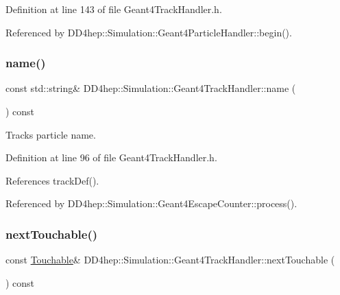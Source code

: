 Definition at line 143 of file Geant4\+Track\+Handler.\+h.



Referenced by D\+D4hep\+::\+Simulation\+::\+Geant4\+Particle\+Handler\+::begin().

\hypertarget{class_d_d4hep_1_1_simulation_1_1_geant4_track_handler_a946b340138f8d53ae394980251f32e77}{}\label{class_d_d4hep_1_1_simulation_1_1_geant4_track_handler_a946b340138f8d53ae394980251f32e77} 
\subsubsection{\texorpdfstring{name()}{name()}}
{\footnotesize\ttfamily const std\+::string\& D\+D4hep\+::\+Simulation\+::\+Geant4\+Track\+Handler\+::name (\begin{DoxyParamCaption}{ }\end{DoxyParamCaption}) const\hspace{0.3cm}{\ttfamily [inline]}}



Track\textquotesingle{}s particle name. 



Definition at line 96 of file Geant4\+Track\+Handler.\+h.



References track\+Def().



Referenced by D\+D4hep\+::\+Simulation\+::\+Geant4\+Escape\+Counter\+::process().

\hypertarget{class_d_d4hep_1_1_simulation_1_1_geant4_track_handler_a372a2c1b761fe31bb51f29a195a787d0}{}\label{class_d_d4hep_1_1_simulation_1_1_geant4_track_handler_a372a2c1b761fe31bb51f29a195a787d0} 
\subsubsection{\texorpdfstring{next\+Touchable()}{nextTouchable()}}
{\footnotesize\ttfamily const \hyperlink{class_d_d4hep_1_1_simulation_1_1_geant4_track_handler_a7db438397a8ccd838ba7bf5fe1b75bdb}{Touchable}\& D\+D4hep\+::\+Simulation\+::\+Geant4\+Track\+Handler\+::next\+Touchable (\begin{DoxyParamCaption}{ }\end{DoxyParamCaption}) const\hspace{0.3cm}{\ttfamily [inline]}}



